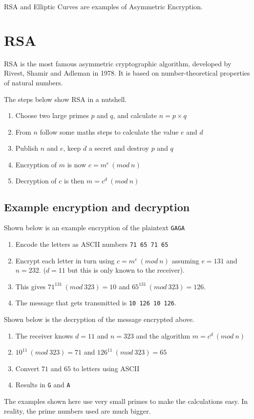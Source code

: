 RSA and Elliptic Curves are examples of Asymmetric Encryption. 

\section*{RSA}
RSA is the most famous asymmetric cryptographic algorithm, developed by Rivest, Shamir and Adleman in 1978. It is based on number-theoretical properties of natural numbers. 

The steps below show RSA in a nutshell.
\begin{enumerate}
    \item Choose two large primes $p$ and $q$, and calculate $n=p\times q$
    \item From $n$ follow some maths steps to calculate the value $e$ and $d$
    \item Publish $n$ and $e$, keep $d$ a secret and destroy $p$ and $q$
    \item Encryption of $m$ is now $c=m^e\  (mod\ n)$
    \item Decryption of $c$ is then $m=c^d\ (mod\ n)$
\end{enumerate}

\subsection*{Example encryption and decryption}
Shown below is an example encryption of the plaintext \verb|GAGA|
\begin{enumerate}
    \item Encode the letters as ASCII numbers \verb|71 65 71 65|
    \item Encrypt each letter in turn using $c=m^e\ (mod\ n)$ assuming $e=131$ and $n=232$. ($d=11$ but this is only known to the receiver).
    \item This gives $71^{131}\ (mod\ 323) = 10$ and $65^{131}\ (mod\ 323) = 126$.
    \item The message that gets transmitted is \verb|10 126 10 126|.
\end{enumerate}

Shown below is the decryption of the message encrypted above.
\begin{enumerate}
    \item The receiver knows $d=11$ and $n=323$ and the algorithm $m=c^d\ (mod\ n)$
    \item $10^{11}\ (mod\ 323) = 71$ and $126^{11}\ (mod\ 323) = 65$
    \item Convert $71$ and $65$ to letters using ASCII
    \item Results in \verb|G| and \verb|A|
\end{enumerate}

The examples shown here use very small primes to make the calculations easy. In reality, the prime numbers used are much bigger. 